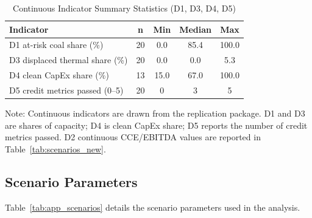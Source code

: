 \documentclass[review,3p,authoryear]{elsarticle}
\begin{document}
\begin{table}[H]
\centering
\caption{Continuous Indicator Summary Statistics (D1, D3, D4, D5)}
\label{tab:continuous_summary}
\small
\begin{tabular}{@{}lcccc@{}}
\toprule
\textbf{Indicator} & \textbf{n} & \textbf{Min} & \textbf{Median} & \textbf{Max} \\
\midrule
D1 at-risk coal share (\%) & 20 & 0.0 & 85.4 & 100.0 \\
D3 displaced thermal share (\%) & 20 & 0.0 & 0.0 & 5.3 \\
D4 clean CapEx share (\%) & 13 & 15.0 & 67.0 & 100.0 \\
D5 credit metrics passed (0--5) & 20 & 0 & 3 & 5 \\
\bottomrule
\end{tabular}
\begin{flushleft}
\footnotesize{Note: Continuous indicators are drawn from the replication package. D1 and D3 are shares of capacity; D4 is clean CapEx share; D5 reports the number of credit metrics passed. D2 continuous CCE/EBITDA values are reported in Table~\ref{tab:scenarios_new}.}
\end{flushleft}
\end{table}

\subsection{Scenario Parameters}
\label{app:scenarios}

Table~\ref{tab:app_scenarios} details the scenario parameters used in the analysis.
\end{document}
